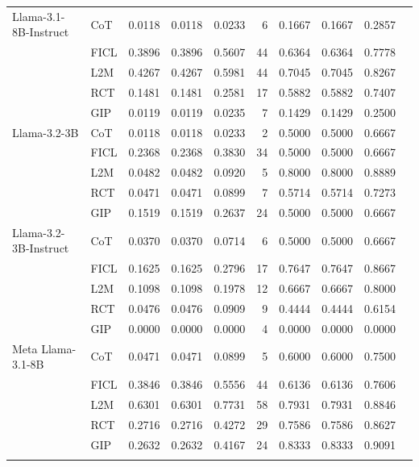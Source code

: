 \documentclass[conference]{IEEEtran}
\begin{document}
\begin{longtable}{p{3.5cm} l r r r r r r r r}
Llama-3.1-8B-Instruct & CoT  & 0.0118 & 0.0118 & 0.0233 & 6 & 0.1667 & 0.1667 & 0.2857 \\
                      & FICL & 0.3896 & 0.3896 & 0.5607 & 44 & 0.6364 & 0.6364 & 0.7778 \\
                      & L2M  & 0.4267 & 0.4267 & 0.5981 & 44 & 0.7045 & 0.7045 & 0.8267 \\
                      & RCT  & 0.1481 & 0.1481 & 0.2581 & 17 & 0.5882 & 0.5882 & 0.7407 \\
                      & GIP  & 0.0119 & 0.0119 & 0.0235 & 7 & 0.1429 & 0.1429 & 0.2500 \\ \addlinespace
Llama-3.2-3B & CoT  & 0.0118 & 0.0118 & 0.0233 & 2 & 0.5000 & 0.5000 & 0.6667 \\
             & FICL & 0.2368 & 0.2368 & 0.3830 & 34 & 0.5000 & 0.5000 & 0.6667 \\
             & L2M  & 0.0482 & 0.0482 & 0.0920 & 5 & 0.8000 & 0.8000 & 0.8889 \\
             & RCT  & 0.0471 & 0.0471 & 0.0899 & 7 & 0.5714 & 0.5714 & 0.7273 \\
             & GIP  & 0.1519 & 0.1519 & 0.2637 & 24 & 0.5000 & 0.5000 & 0.6667 \\ \addlinespace
Llama-3.2-3B-Instruct & CoT  & 0.0370 & 0.0370 & 0.0714 & 6 & 0.5000 & 0.5000 & 0.6667 \\
                      & FICL & 0.1625 & 0.1625 & 0.2796 & 17 & 0.7647 & 0.7647 & 0.8667 \\
                      & L2M  & 0.1098 & 0.1098 & 0.1978 & 12 & 0.6667 & 0.6667 & 0.8000 \\
                      & RCT  & 0.0476 & 0.0476 & 0.0909 & 9 & 0.4444 & 0.4444 & 0.6154 \\
                      & GIP  & 0.0000 & 0.0000 & 0.0000 & 4 & 0.0000 & 0.0000 & 0.0000 \\ \addlinespace
Meta Llama-3.1-8B & CoT  & 0.0471 & 0.0471 & 0.0899 & 5 & 0.6000 & 0.6000 & 0.7500 \\
                  & FICL & 0.3846 & 0.3846 & 0.5556 & 44 & 0.6136 & 0.6136 & 0.7606 \\
                  & L2M  & 0.6301 & 0.6301 & 0.7731 & 58 & 0.7931 & 0.7931 & 0.8846 \\
                  & RCT  & 0.2716 & 0.2716 & 0.4272 & 29 & 0.7586 & 0.7586 & 0.8627 \\
                  & GIP  & 0.2632 & 0.2632 & 0.4167 & 24 & 0.8333 & 0.8333 & 0.9091 \\ \addlinespace

\end{longtable}
\end{document}
